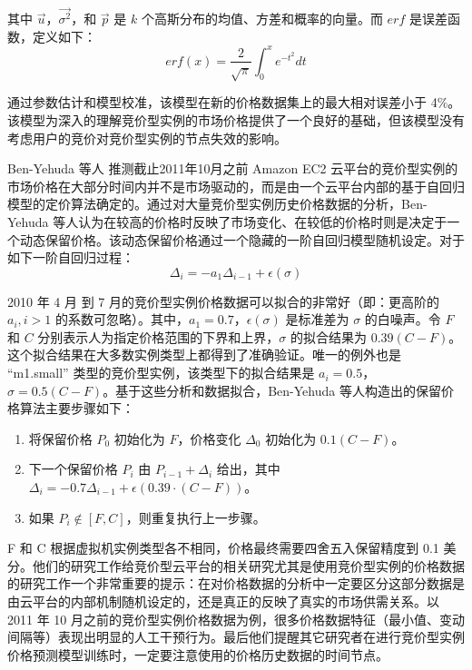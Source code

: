 其中 $\vec u$，$\vec{\sigma^2}$，和 $\vec p$ 是 $k$ 个高斯分布的均值、方差和概率的向量。而 $erf$ 是误差函数，定义如下：
\begin{equation}\label{eq_erf}\nonumber 
erf(x) = \frac{2}{\sqrt{\pi}}\int_{0}^{x} e^{-t^2}dt
\end{equation}

通过参数估计和模型校准，该模型在新的价格数据集上的最大相对误差小于 4\%。该模型为深入的理解竞价型实例的市场价格提供了一个良好的基础，但该模型没有考虑用户的竞价对竞价型实例的节点失效的影响。

Ben-Yehuda 等人 \cite{AgmonBen-Yehuda:2013:DAE:2509413.2509416} 推测截止2011年10月之前 Amazon EC2 云平台的竞价型实例的市场价格在大部分时间内并不是市场驱动的，而是由一个云平台内部的基于自回归模型的定价算法确定的。通过对大量竞价型实例历史价格数据的分析，Ben-Yehuda 等人认为在较高的价格时反映了市场变化、在较低的价格时则是决定于一个动态保留价格。该动态保留价格通过一个隐藏的一阶自回归模型随机设定。对于如下一阶自回归过程：
\begin{equation}\label{eq_ar1}\nonumber 
\Delta_i = - a_1\Delta_{i-1}+\epsilon(\sigma)
\end{equation}

2010 年 4 月 到 7 月的竞价型实例价格数据可以拟合的非常好（即：更高阶的 $a_i, i > 1$ 的系数可忽略）。其中，$a_1 = 0.7$，$\epsilon(\sigma)$ 是标准差为 $\sigma$ 的白噪声。令 $F$ 和 $C$ 分别表示人为指定价格范围的下界和上界，$\sigma$ 的拟合结果为 $0.39 (C - F)$。这个拟合结果在大多数实例类型上都得到了准确验证。唯一的例外也是 ``m1.small'' 类型的竞价型实例，该类型下的拟合结果是 $a_i = 0.5$，$\sigma = 0.5 (C - F)$。基于这些分析和数据拟合，Ben-Yehuda 等人构造出的保留价格算法主要步骤如下：
\begin{enumerate}
\item 将保留价格 $P_0$ 初始化为 $F$，价格变化 $\Delta_0$ 初始化为 $0.1 (C - F)$。
\item 下一个保留价格 $P_i$ 由 $P_{i-1} + \Delta_i$ 给出，其中 $\Delta_i = - 0.7 \Delta_{i-1}+\epsilon(0.39 \cdot (C - F))$。
\item 如果 $P_i \notin [F, C]$，则重复执行上一步骤。
\end{enumerate}

F 和 C 根据虚拟机实例类型各不相同，价格最终需要四舍五入保留精度到 0.1 美分。他们的研究工作给竞价型云平台的相关研究尤其是使用竞价型实例的价格数据的研究工作一个非常重要的提示：在对价格数据的分析中一定要区分这部分数据是由云平台的内部机制随机设定的，还是真正的反映了真实的市场供需关系。以 2011 年 10 月之前的竞价型实例价格数据为例，很多价格数据特征（最小值、变动间隔等）表现出明显的人工干预行为。最后他们提醒其它研究者在进行竞价型实例价格预测模型训练时，一定要注意使用的价格历史数据的时间节点。

